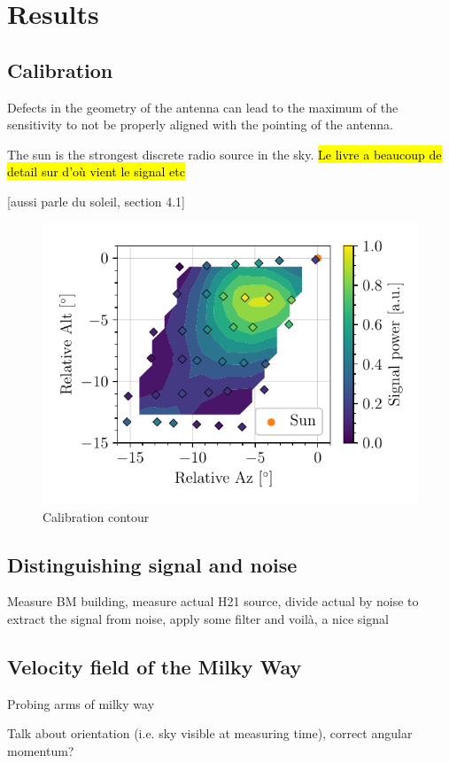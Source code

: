 \section{Results}
\subsection{Calibration}
Defects in the geometry of the antenna can lead to the maximum of the sensitivity to not be properly aligned with the pointing of the antenna.


The sun is the strongest discrete radio source in the sky\cite{burke_introduction_2013}. \hl{Le livre a beaucoup de detail sur d'où vient le signal etc}

[aussi \cite{lauterbach_radio_2022} parle du soleil, section 4.1]

\begin{figure}[htbp]
    \centering
    \includegraphics[scale=1]{figures/calibration_contour.pdf}
    \caption{Calibration contour}
    \label{fig:calibration_contour}
\end{figure}

\subsection{Distinguishing signal and noise}
Measure BM building, measure actual H21 source, divide actual by noise to extract the signal from noise, apply some filter and voilà, a nice signal

\subsection{Velocity field of the Milky Way}
Probing arms of milky way

Talk about orientation (i.e. sky visible at measuring time), correct angular momentum?
